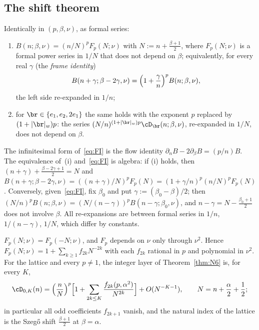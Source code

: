 \subsection{The shift theorem}\label{sec:shift-thm}
\begin{theorem}[shift]\label{thm:shift}
Identically in $(p,\beta,\nu)$, as formal series:
\begin{enumerate}
\item[(i)] $B(n;\beta,\nu)=(n/N)^pF_p(N;\nu)$ with $N:=n+\frac{\beta+1}2$, where $F_p(N;\nu)$ is a formal power series in $1/N$
that does not depend on $\beta$; equivalently, for every real $\gamma$ (the \emph{frame identity})
\begin{equation}\label{eq:FI}
  B(n+\gamma;\beta-2\gamma,\nu)=\Bigl(1+\frac\gamma n\Bigr)^pB(n;\beta,\nu),
\end{equation}
the left side re-expanded in $1/n$;
\item[(ii)] for $\br\in\{e_1,e_2,2e_1\}$ the same holds with the exponent $p$ replaced by $(1+|\br|_w)p$: the series
$(N/n)^{(1+|\br|_w)p}\cD_{\br}(n;\beta,\nu)$, re-expanded in $1/N$, does not depend on $\beta$.
\end{enumerate}
\end{theorem}

The infinitesimal form of~\eqref{eq:FI} is the flow identity $\partial_nB-2\partial_\beta B=(p/n)B$. The equivalence of~(i)
and~\eqref{eq:FI} is algebra: if (i) holds, then $(n+\gamma)+\frac{\beta-2\gamma+1}2=N$ and
$B(n+\gamma;\beta-2\gamma,\nu)=((n+\gamma)/N)^pF_p(N)=(1+\gamma/n)^p(n/N)^pF_p(N)$. Conversely, given~\eqref{eq:FI}, fix
$\beta_0$ and put $\gamma:=(\beta_0-\beta)/2$; then $(N/n)^pB(n;\beta,\nu)=(N/(n-\gamma))^pB(n-\gamma;\beta_0,\nu)$, and
$n-\gamma=N-\frac{\beta_0+1}2$ does not involve $\beta$. All re-expansions are between formal series in $1/n$, $1/(n-\gamma)$,
$1/N$, which differ by constants.

\begin{corollary}[evenness]\label{cor:even}
$F_p(N;\nu)=F_p(-N;\nu)$, and $F_p$ depends on $\nu$ only through $\nu^2$. Hence $F_p(N;\nu)=1+\sum_{k\ge1}f_{2k}N^{-2k}$ with
each $f_{2k}$ rational in $p$ and polynomial in $\nu^2$. For the lattice and every $p\ne1$, the integer layer of
Theorem~\ref{thm:N6} is, for every $K$,
\[
  \cD_{0,K}(n)=\Bigl(\frac nN\Bigr)^p\Bigl[1+\sum_{2k\le K}\frac{f_{2k}(p,\alpha^2)}{N^{2k}}\Bigr]+O(N^{-K-1}),\qquad N=n+\frac\alpha2+\frac12 ;
\]
in particular all odd coefficients $f_{2k+1}$ vanish, and the natural index of the lattice is the Szeg\H{o} shift $\frac{\beta+1}2$ at
$\beta=\alpha$.
\end{corollary}


